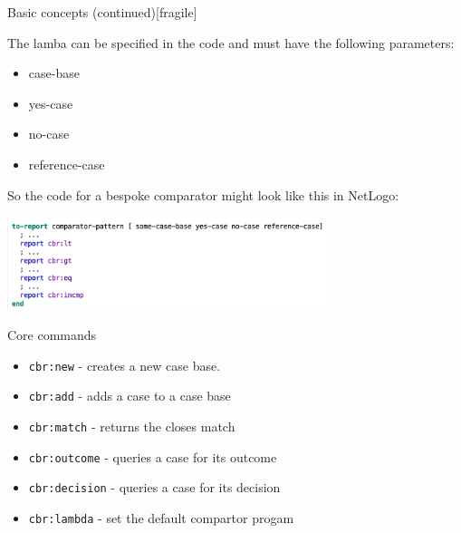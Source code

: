 \documentclass[usenames,dvipsnames,10pt]{beamer} %
\begin{document}
\begin{frame}{Basic concepts (continued)}[fragile]

    The lamba can be specified in the code and must have the following
    parameters:

    \begin{itemize}
        \item case-base
        \item yes-case
        \item no-case
        \item reference-case
    \end{itemize}

    So the code for a bespoke comparator might look like this in NetLogo: 

    \includegraphics[width=9.5cm]{blank-comparator.png}

\end{frame}

\begin{frame}{Core commands}

    \begin{itemize}
        \item {\color{red}\texttt{cbr:new}} - creates a new case base.
        \item {\color{red}\texttt{cbr:add}} - adds a case to a case base
        \item {\color{red}\texttt{cbr:match}} - returns the closes match
        \item {\color{red}\texttt{cbr:outcome}} - queries a case for its outcome
        \item {\color{red}\texttt{cbr:decision}} - queries a case for its decision
        \item {\color{red}\texttt{cbr:lambda}} - set the default compartor progam
    \end{itemize}

\end{frame}
\end{document}
